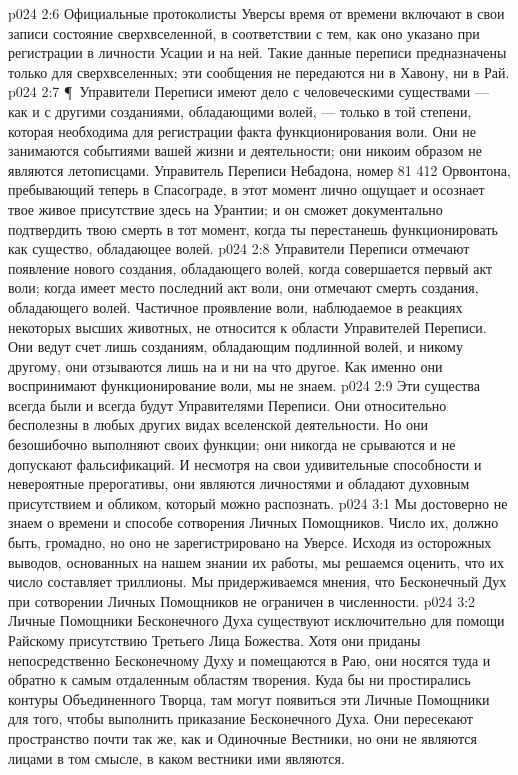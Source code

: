 \vs p024 2:6 Официальные протоколисты Уверсы время от времени включают в свои записи состояние сверхвселенной, в соответствии с тем, как оно указано при регистрации в личности Усации и на ней. Такие данные переписи предназначены только для сверхвселенных; эти сообщения не передаются ни в Хавону, ни в Рай.
\vs p024 2:7 \P\ Управители Переписи имеют дело с человеческими существами --- как и с другими созданиями, обладающими волей, --- только в той степени, которая необходима для регистрации факта функционирования воли. Они не занимаются событиями вашей жизни и деятельности; они никоим образом не являются летописцами. Управитель Переписи Небадона, номер 81 412 Орвонтона, пребывающий теперь в Спасограде, в этот момент лично ощущает и осознает твое живое присутствие здесь на Урантии; и он сможет документально подтвердить твою смерть в тот момент, когда ты перестанешь функционировать как существо, обладающее волей.
\vs p024 2:8 Управители Переписи отмечают появление нового создания, обладающего волей, когда совершается первый акт воли; когда имеет место последний акт воли, они отмечают смерть создания, обладающего волей. Частичное проявление воли, наблюдаемое в реакциях некоторых высших животных, не относится к области Управителей Переписи. Они ведут счет лишь созданиям, обладающим подлинной волей, и никому другому, они отзываются лишь на  и ни на что другое. Как именно они воспринимают функционирование воли, мы не знаем.
\vs p024 2:9 Эти существа всегда были и всегда будут Управителями Переписи. Они относительно бесполезны в любых других видах вселенской деятельности. Но они безошибочно выполняют своих функции; они никогда не срываются и не допускают фальсификаций. И несмотря на свои удивительные способности и невероятные прерогативы, они являются личностями и обладают духовным присутствием и обликом, который можно распознать.
\vs p024 3:1 Мы достоверно не знаем о времени и способе сотворения Личных Помощников. Число их, должно быть, громадно, но оно не зарегистрировано на Уверсе. Исходя из осторожных выводов, основанных на нашем знании их работы, мы решаемся оценить, что их число составляет триллионы. Мы придерживаемся мнения, что Бесконечный Дух при сотворении Личных Помощников не ограничен в численности.
\vs p024 3:2 Личные Помощники Бесконечного Духа существуют исключительно для помощи Райскому присутствию Третьего Лица Божества. Хотя они приданы непосредственно Бесконечному Духу и помещаются в Раю, они носятся туда и обратно к самым отдаленным областям творения. Куда бы ни простирались контуры Объединенного Творца, там могут появиться эти Личные Помощники для того, чтобы выполнить приказание Бесконечного Духа. Они пересекают пространство почти так же, как и Одиночные Вестники, но они не являются лицами в том смысле, в каком вестники ими являются.
